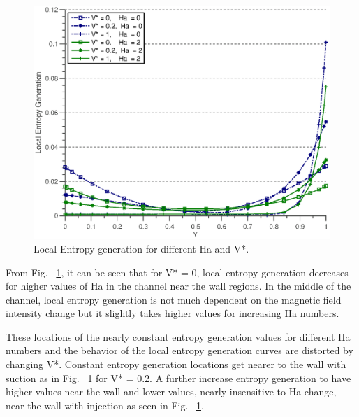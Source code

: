 \begin{figure}
  \includegraphics[scale=0.8]{figures/fig9.eps}
\vspace*{6mm}
\caption{Local Entropy generation for different Ha and V*.}
\label{fig:9}       %
\end{figure}

From Fig. ~\ref{fig:9}, it can be seen that for V* = 0, local entropy generation decreases for higher values of Ha in the channel near the wall regions. In the middle of the channel, local entropy generation is not much dependent on the magnetic field intensity change but it slightly takes higher values for increasing Ha numbers. 

These locations of the nearly constant entropy generation values for different Ha numbers and the behavior of the local entropy generation curves are distorted by changing V*. Constant entropy generation locations get nearer to the wall with suction as in Fig. ~\ref{fig:9} for V* = 0.2.  A further increase  entropy generation to have higher values near the wall and lower values, nearly insensitive to Ha change, near the wall with injection as seen in Fig. ~\ref{fig:9}.

